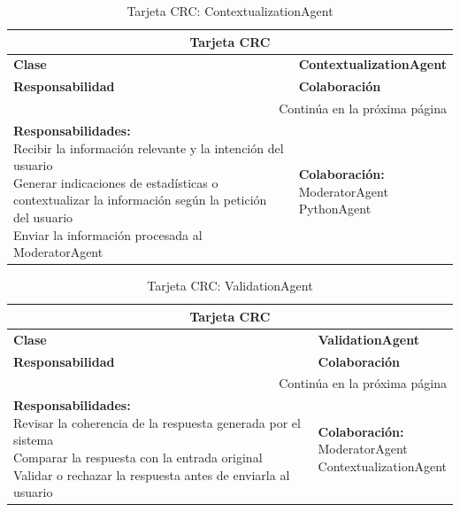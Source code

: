 \begin{longtable}{|l|l|}
	\caption{Tarjeta CRC: ContextualizationAgent} \label{tablacrc3} \\
	
	\hline
	\multicolumn{2}{|c|}{\textbf{Tarjeta CRC}} \\
	\hline
	\textbf{Clase} & \textbf{ContextualizationAgent} \\
	\hline
	\endfirsthead
	
	\hline
	\textbf{Responsabilidad} & \textbf{Colaboración} \\
	\hline
	\endhead
	
	\hline
	\multicolumn{2}{|r|}{Continúa en la próxima página} \\
	\hline
	\endfoot
	
	\hline
	\endlastfoot
	
	\parbox[t]{0.45\linewidth}{\textbf{Responsabilidades:} \\ 
		Recibir la información relevante y la intención del usuario \\ 
		Generar indicaciones de estadísticas o contextualizar la información según la petición del usuario \\ 
		Enviar la información procesada al ModeratorAgent} 
	& 
	\parbox[t]{0.45\linewidth}{\textbf{Colaboración:} \\
		ModeratorAgent \\ 
		PythonAgent}
\end{longtable}


\begin{longtable}{|l|l|}
	\caption{Tarjeta CRC: ValidationAgent} \label{tablacrc4} \\
	
	\hline
	\multicolumn{2}{|c|}{\textbf{Tarjeta CRC}} \\
	\hline
	\textbf{Clase} & \textbf{ValidationAgent} \\
	\hline
	\endfirsthead
	
	\hline
	\textbf{Responsabilidad} & \textbf{Colaboración} \\
	\hline
	\endhead
	
	\hline
	\multicolumn{2}{|r|}{Continúa en la próxima página} \\
	\hline
	\endfoot
	
	\hline
	\endlastfoot
	
	\parbox[t]{0.45\linewidth}{\textbf{Responsabilidades:} \\ 
		Revisar la coherencia de la respuesta generada por el sistema \\ 
		Comparar la respuesta con la entrada original \\ 
		Validar o rechazar la respuesta antes de enviarla al usuario} 
	& 
	\parbox[t]{0.45\linewidth}{\textbf{Colaboración:} \\
		ModeratorAgent \\ 
		ContextualizationAgent}
\end{longtable}

